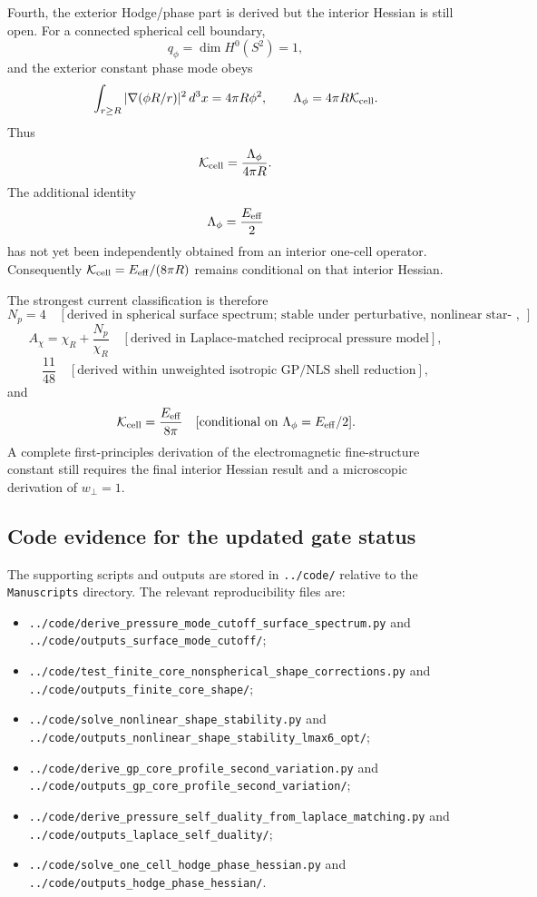 \documentclass[aps,pra,preprint,longbibliography,nofootinbib]{revtex4-2}
\begin{document}
Fourth, the exterior Hodge/phase part is derived but the interior Hessian is
still open.  For a connected spherical cell boundary,
\[
  q_\phi=\dim H^0(S^2)=1,
\]
and the exterior constant phase mode obeys
\[
  \int_{r\ge R}|\nabla(\phi R/r)|^2\,d^3x=4\pi R\phi^2,
  \qquad
  \Lambda_\phi=4\pi R\mathcal K_{\rm cell}.
\]
Thus
\[
  \mathcal K_{\rm cell}=\frac{\Lambda_\phi}{4\pi R}.
\]
The additional identity
\[
  \Lambda_\phi=\frac{E_{\rm eff}}{2}
\]
has not yet been independently obtained from an interior one-cell operator.
Consequently \(\mathcal K_{\rm cell}=E_{\rm eff}/(8\pi R)\) remains
conditional on that interior Hessian.

The strongest current classification is therefore
\[
  N_p=4
  \quad[\text{derived in spherical surface spectrum; stable under perturbative, nonlinear star-shaped, and finite-perimeter global-topology checks}],
\]
\[
  A_\chi=\chi_R+\frac{N_p}{\chi_R}
  \quad[\text{derived in Laplace-matched reciprocal pressure model}],
\]
\[
  \frac{11}{48}
  \quad[\text{derived within unweighted isotropic GP/NLS shell reduction}],
\]
and
\[
  \mathcal K_{\rm cell}=\frac{E_{\rm eff}}{8\pi}
  \quad[\text{conditional on }\Lambda_\phi=E_{\rm eff}/2].
\]
A complete first-principles derivation of the electromagnetic fine-structure
constant still requires the final interior Hessian result and a microscopic
derivation of \(w_\perp=1\).



\subsection*{Code evidence for the updated gate status}

The supporting scripts and outputs are stored in \texttt{../code/} relative to
the \texttt{Manuscripts} directory.  The relevant reproducibility files are:
\begin{itemize}
\item \texttt{../code/derive\_pressure\_mode\_cutoff\_surface\_spectrum.py}
and \texttt{../code/outputs\_surface\_mode\_cutoff/};
\item \texttt{../code/test\_finite\_core\_nonspherical\_shape\_corrections.py}
and \texttt{../code/outputs\_finite\_core\_shape/};
\item \texttt{../code/solve\_nonlinear\_shape\_stability.py} and
\texttt{../code/outputs\_nonlinear\_shape\_stability\_lmax6\_opt/};
\item \texttt{../code/derive\_gp\_core\_profile\_second\_variation.py} and
\texttt{../code/outputs\_gp\_core\_profile\_second\_variation/};
\item \texttt{../code/derive\_pressure\_self\_duality\_from\_laplace\_matching.py}
and \texttt{../code/outputs\_laplace\_self\_duality/};
\item \texttt{../code/solve\_one\_cell\_hodge\_phase\_hessian.py} and
\texttt{../code/outputs\_hodge\_phase\_hessian/}.
\end{itemize}
\end{document}
